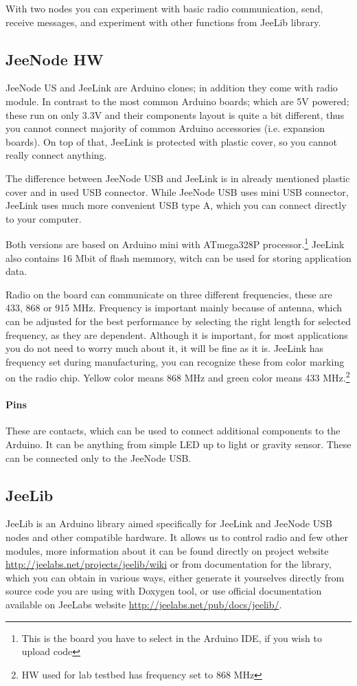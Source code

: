 \documentclass[12pt,titlepage]{article}
\begin{document}
With two nodes you can experiment with basic radio communication, send, receive messages, and experiment with other functions from JeeLib library.

     \subsection{JeeNode HW }
JeeNode US and JeeLink are Arduino clones; in addition they come with radio module. In contrast to the most common Arduino boards; which are 5V powered; these run on only 3.3V and their components layout is quite a bit different, thus you cannot connect majority of common Arduino accessories (i.e. expansion boards). On top of that, JeeLink is protected with plastic cover, so you cannot really connect anything.

The difference between JeeNode USB and JeeLink is in already mentioned plastic cover and in used USB connector. While JeeNode USB uses mini USB connector, JeeLink uses much more convenient USB type A, which you can connect directly to your computer.

Both versions are based on Arduino mini with ATmega328P processor.\footnote{This is the board you have to select in the Arduino IDE, if you wish to upload code}
JeeLink also contains 16 Mbit of flash memmory, witch can be used for storing application data.

Radio on the board can communicate on three different frequencies, these are 433, 868 or 915 MHz. Frequency is important mainly because of antenna, which can be adjusted for the best performance by selecting the right length for selected frequency, as they are dependent. Although it is important, for most applications you do not need to worry much about it, it will be fine as it is.  JeeLink has frequency set during manufacturing, you can recognize these from color marking on the radio chip. Yellow color means 868 MHz and green color means 433 MHz.\footnote{HW used for lab testbed has frequency set to 868 MHz}
\paragraph{Pins}
  These are contacts, which can be used to connect additional components to the Arduino. It can be anything from simple LED up to light or gravity sensor. These can be connected only to the JeeNode USB.

  \subsection{JeeLib}
    JeeLib is an Arduino library aimed specifically for JeeLink and JeeNode USB nodes and other compatible hardware. It allows us to control radio and few other modules, more information about it can be found directly on project website \url{http://jeelabs.net/projects/jeelib/wiki} or from documentation for the library, which you can obtain in various ways, either generate it yourselves directly from source code you are using with Doxygen tool, or use official documentation available on JeeLabs website \url{http://jeelabs.net/pub/docs/jeelib/}.
\end{document}
